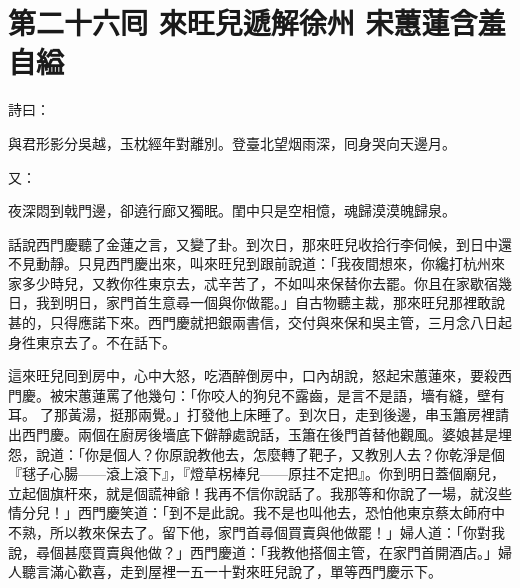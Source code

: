 
\chapter*{第二十六囘 來旺兒遞解徐州 宋蕙蓮含羞自縊}


詩曰：

與君形影分吳越，玉枕經年對離別。登臺北望烟雨深，囘身哭向天邊月。

又：

夜深悶到戟門邊，卻遶行廊又獨眠。閨中只是空相憶，魂歸漠漠魄歸泉。

話說西門慶聽了金蓮之言，又變了卦。到次日，那來旺兒收拾行李伺候，到日中還不見動靜。只見西門慶出來，叫來旺兒到跟前說道：「我夜間想來，你纔打杭州來家多少時兒，又教你徃東京去，忒辛苦了，不如叫來保替你去罷。你且在家歇宿幾日，我到明日，家門首生意尋一個與你做罷。」自古物聽主裁，那來旺兒那裡敢說甚的，只得應諾下來。西門慶就把銀兩書信，交付與來保和吳主管，三月念八日起身徃東京去了。不在話下。

這來旺兒囘到房中，心中大怒，{}吃酒醉倒房中，口內胡說，怒起宋蕙蓮來，要殺西門慶。{}被宋蕙蓮罵了他幾句：「你咬人的狗兒不露齒，是言不是語，墻有縫，壁有耳。𠳹了那黃湯，挺那兩覺。」打發他上床睡了。到次日，走到後邊，串玉簫房裡請出西門慶。兩個在廚房後墻底下僻靜處說話，玉簫在後門首替他觀風。婆娘甚是埋怨，說道：「你是個人？你原說教他去，怎麼轉了靶子，又教別人去？你乾淨是個『毬子心腸——滾上滾下』，{}『燈草柺棒兒——原拄不定把』。你到明日蓋個廟兒，立起個旗杆來，就是個謊神爺！我再不信你說話了。我那等和你說了一場，就沒些情分兒！」{}西門慶笑道：「到不是此說。我不是也叫他去，恐怕他東京蔡太師府中不熟，所以教來保去了。留下他，家門首尋個買賣與他做罷！」婦人道：「你對我說，尋個甚麼買賣與他做？」西門慶道：「我教他搭個主管，在家門首開酒店。」婦人聽言滿心歡喜，走到屋裡一五一十對來旺兒說了，{}單等西門慶示下。

